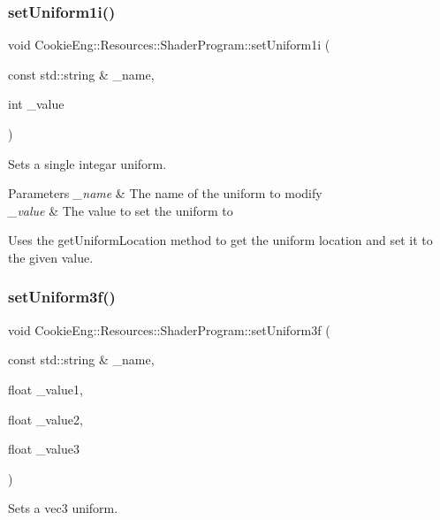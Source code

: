\subsubsection{\texorpdfstring{set\+Uniform1i()}{setUniform1i()}}
{\footnotesize\ttfamily void Cookie\+Eng\+::\+Resources\+::\+Shader\+Program\+::set\+Uniform1i (\begin{DoxyParamCaption}\item[{const std\+::string \&}]{\+\_\+name,  }\item[{int}]{\+\_\+value }\end{DoxyParamCaption})}



Sets a single integar uniform. 


\begin{DoxyParams}{Parameters}
{\em \+\_\+name} & The name of the uniform to modify \\
\hline
{\em \+\_\+value} & The value to set the uniform to\\
\hline
\end{DoxyParams}
Uses the get\+Uniform\+Location method to get the uniform location and set it to the given value. \mbox{\label{class_cookie_eng_1_1_resources_1_1_shader_program_ad13eabf4105d4d484d72c16696143254}} 
\subsubsection{\texorpdfstring{set\+Uniform3f()}{setUniform3f()}}
{\footnotesize\ttfamily void Cookie\+Eng\+::\+Resources\+::\+Shader\+Program\+::set\+Uniform3f (\begin{DoxyParamCaption}\item[{const std\+::string \&}]{\+\_\+name,  }\item[{float}]{\+\_\+value1,  }\item[{float}]{\+\_\+value2,  }\item[{float}]{\+\_\+value3 }\end{DoxyParamCaption})}



Sets a vec3 uniform. 


